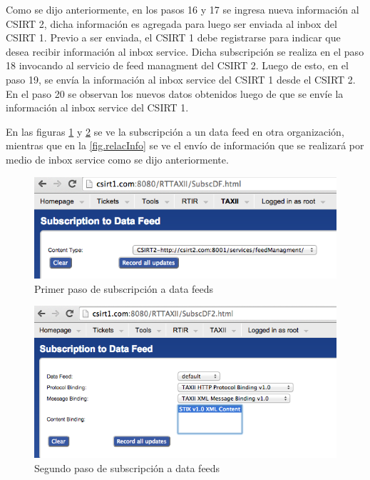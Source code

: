 Como se dijo anteriormente, en los pasos 16 y 17 se ingresa nueva información al CSIRT 2, dicha información es agregada para luego ser enviada al inbox del CSIRT 1. Previo a ser enviada, el CSIRT 1 debe registrarse para indicar que desea recibir información al inbox service. Dicha subscripción se realiza en el paso 18 invocando al servicio de feed managment del CSIRT 2. Luego de esto, en el paso 19, se envía la información al inbox service del CSIRT 1 desde el CSIRT 2.
En el paso 20 se observan los nuevos datos obtenidos luego de que se envíe la información al inbox service del CSIRT 1.

En las figuras \ref{fig.subfeed} y \ref{fig.subdf} se ve la subscripción a un data feed en otra organización, mientras que en la \ref{fig.relacInfo} se ve el envío de información que se realizará por medio de inbox service como se dijo anteriormente.

\begin{figure}[H]
	\centering
	\includegraphics[scale=0.4]{caso-de-estudio/subscriptionfeed.png}
	\caption{Primer paso de subscripción a data feeds}
	\label{fig.subfeed}
\end{figure}

\begin{figure}[H]
	\centering
	\includegraphics[scale=0.4]{caso-de-estudio/subscriptiondf.png}
	\caption{Segundo paso de subscripción a data feeds}
	\label{fig.subdf}
\end{figure}


